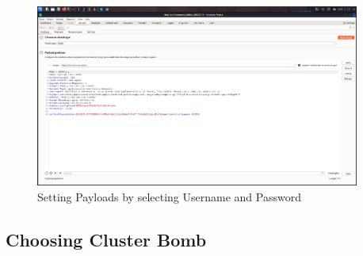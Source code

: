 \documentclass[11pt]{article}
\begin{document}
\begin{figure}[H]
    \centering
    \includegraphics[width=0.95\textwidth]{burpsuite (4).png}
    \caption{Setting Payloads by selecting Username and Password}
    \label{fig:1}
\end{figure}
\subsection{Choosing Cluster Bomb}



\end{document}
